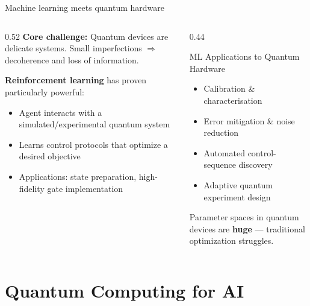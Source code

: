 \documentclass[aspectratio=169]{beamer}
\begin{document}
\begin{frame}{Machine learning meets quantum hardware}

  \begin{columns}[T]
    \begin{column}{0.52\textwidth}
      \textbf{Core challenge:} Quantum devices are delicate systems.
      Small imperfections $\Rightarrow$ decoherence and loss of information.

      \bigskip
      \textbf{Reinforcement learning} has proven particularly powerful:
      \begin{itemize}
        \item Agent interacts with a simulated/experimental quantum system
        \item Learns control protocols that optimize a desired objective
        \item Applications: state preparation, high-fidelity gate implementation
      \end{itemize}
    \end{column}
    \begin{column}{0.44\textwidth}
      \begin{block}{ML Applications to Quantum Hardware}
        \begin{itemize}
          \item Calibration \& characterisation
          \item Error mitigation \& noise reduction
          \item Automated control-sequence discovery
          \item Adaptive quantum experiment design
        \end{itemize}
      \end{block}
      \medskip
      \small Parameter spaces in quantum devices are \textbf{huge}
      — traditional optimization struggles.
    \end{column}
  \end{columns}

\end{frame}

\section{Quantum Computing for AI}
\end{document}
